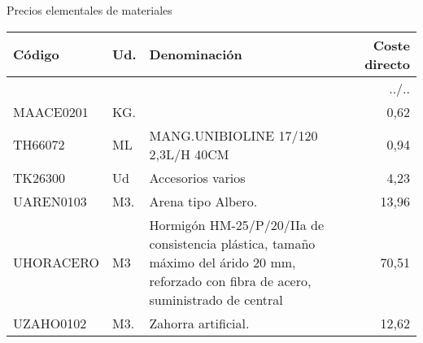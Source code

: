 \documentclass{book}%
\begin{document}
\normalsize%
\begin{center}
%
\Large%
 Precios elementales de materiales %
\normalsize%
\end{center}
%
\small%
\begin{longtable}{|l|l|p{4cm}|r|}%
\hline%
Código&Ud.&Denominación&Coste directo\\%
\hline%
\endhead%
\hline%
\multicolumn{4}{|r|}{../..}\\%
\hline%
\endfoot%
\hline%
\endlastfoot%
MAACE0201&KG.&&      0,62\\%
TH66072&ML&MANG.UNIBIOLINE 17/120 2,3L/H 40CM&      0,94\\%
TK26300&Ud&Accesorios varios&      4,23\\%
UAREN0103&M3.&Arena tipo Albero.&     13,96\\%
UHORACERO&M3&Hormigón HM{-}25/P/20/IIa de consistencia plástica, tamaño máximo del árido 20 mm, reforzado con fibra de acero, suministrado de central&     70,51\\%
UZAHO0102&M3.&Zahorra artificial.&     12,62\\%
\end{longtable}%
\normalsize

%
\end{document}
